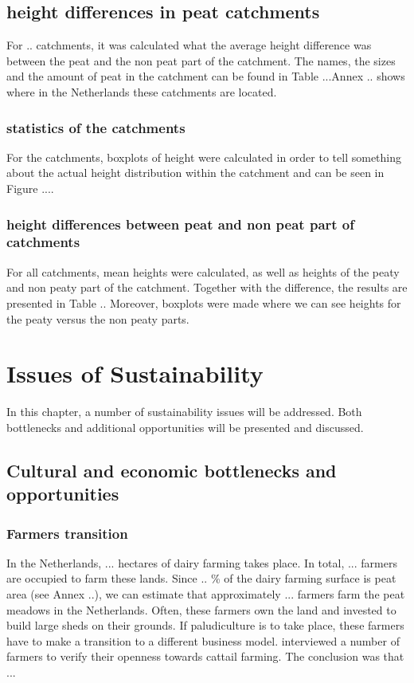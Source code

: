 \documentclass[a4paper,12pt]{scrbook}
\begin{document}
\section{height differences in peat catchments}
For .. catchments, it was calculated what the average height difference was between the peat and the non peat part of the catchment. The names, the sizes and the amount of peat in the catchment can be found in Table ...Annex .. shows where in the Netherlands these catchments are located.

\subsection{statistics of the catchments}
For the catchments, boxplots of height were calculated in order to tell something about the actual height distribution within the catchment and can be seen in Figure .... 

\subsection{height differences between peat and non peat part of catchments} 
For all catchments, mean heights were calculated, as well as heights of the peaty and non peaty part of the catchment. Together with the difference, the results are presented in Table .. Moreover, boxplots were made where we can see heights for the peaty versus the non peaty parts.

\chapter{Issues of Sustainability}

In this chapter, a number of sustainability issues will be addressed. Both bottlenecks and additional opportunities will be presented and discussed.

\section{Cultural and economic bottlenecks and opportunities}

\subsection{Farmers transition}
In the Netherlands, ... hectares of dairy farming takes place. In total, ... farmers are occupied to farm these lands. Since .. \% of the dairy farming surface is peat area (see Annex ..), we can estimate that approximately ... farmers farm the peat meadows in the Netherlands. Often, these farmers own the land and invested to build large sheds on their grounds. If paludiculture is to take place, these farmers have to make a transition to a different business model. \citet{sindram2017} interviewed a number of farmers to verify their openness towards cattail farming. The conclusion was that ... 
\end{document}
